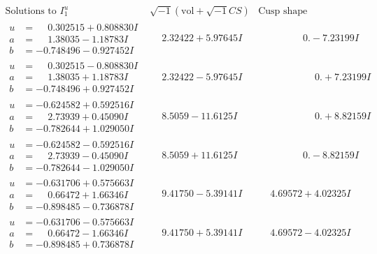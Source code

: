 \documentclass[1p]{elsarticle_modified}
\theoremstyle{definition}
\newcommand{\I}{\sqrt{-1}}
\begin{document}
$$\begin{array}{c|c|c}  
\text{Solutions to }I^u_{1}& \I (\text{vol} + \sqrt{-1}CS) & \text{Cusp shape}\\
 \hline 
\begin{aligned}
u &= \phantom{-}0.302515 + 0.808830 I \\
a &= \phantom{-}1.38035 - 1.18783 I \\
b &= -0.748496 - 0.927452 I\end{aligned}
 & \phantom{-}2.32422 + 5.97645 I & \phantom{-0.000000 } 0. - 7.23199 I \\ \hline\begin{aligned}
u &= \phantom{-}0.302515 - 0.808830 I \\
a &= \phantom{-}1.38035 + 1.18783 I \\
b &= -0.748496 + 0.927452 I\end{aligned}
 & \phantom{-}2.32422 - 5.97645 I & \phantom{-0.000000 -}0. + 7.23199 I \\ \hline\begin{aligned}
u &= -0.624582 + 0.592516 I \\
a &= \phantom{-}2.73939 + 0.45090 I \\
b &= -0.782644 + 1.029050 I\end{aligned}
 & \phantom{-}8.5059 - 11.6125 I & \phantom{-0.000000 -}0. + 8.82159 I \\ \hline\begin{aligned}
u &= -0.624582 - 0.592516 I \\
a &= \phantom{-}2.73939 - 0.45090 I \\
b &= -0.782644 - 1.029050 I\end{aligned}
 & \phantom{-}8.5059 + 11.6125 I & \phantom{-0.000000 } 0. - 8.82159 I \\ \hline\begin{aligned}
u &= -0.631706 + 0.575663 I \\
a &= \phantom{-}0.66472 + 1.66346 I \\
b &= -0.898485 - 0.736878 I\end{aligned}
 & \phantom{-}9.41750 - 5.39141 I & \phantom{-}4.69572 + 4.02325 I \\ \hline\begin{aligned}
u &= -0.631706 - 0.575663 I \\
a &= \phantom{-}0.66472 - 1.66346 I \\
b &= -0.898485 + 0.736878 I\end{aligned}
 & \phantom{-}9.41750 + 5.39141 I & \phantom{-}4.69572 - 4.02325 I \\ \hline\begin{aligned}

\end{aligned}
\end{array}$$
\end{document}
